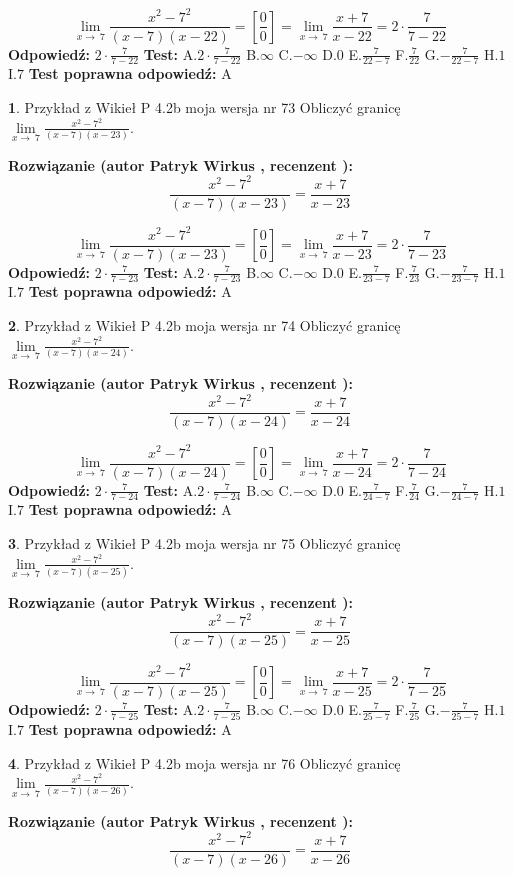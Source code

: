 \documentclass[12pt, a4paper]{article}
\theoremstyle{definition} %
\newtheorem{zad}{}
\newcommand{\zadStart}[1]{\begin{zad}#1\newline}
\newcommand{\zadStop}{\end{zad}}
\newcommand{\rozwStart}[2]{\noindent \textbf{Rozwiązanie (autor #1 , recenzent #2): }\newline}
\newcommand{\rozwStop}{\newline}
\newcommand{\odpStart}{\noindent \textbf{Odpowiedź:}\newline}
\newcommand{\odpStop}{\newline}
\newcommand{\testStart}{\noindent \textbf{Test:}\newline}
\newcommand{\testStop}{\newline}
\newcommand{\kluczStart}{\noindent \textbf{Test poprawna odpowiedź:}\newline}
\newcommand{\kluczStop}{\newline}
\begin{document}
$$\lim\limits_{x\to\ 7}\frac{x^{2}-7^{2}}{(x-7)(x-22)}=[\frac{0}{0}]=\lim\limits_{x\to\ 7}\frac{x+7}{x-22}=2 \cdot \frac{7}{7-22}$$
\rozwStop
\odpStart
$2 \cdot \frac{7}{7-22}$
\odpStop
\testStart
A.$2 \cdot \frac{7}{7-22}$
B.$\infty$
C.$-\infty$
D.$0$
E.$\frac{7}{22-7}$
F.$\frac{7}{22}$
G.$-\frac{7}{22-7}$
H.$1$
I.$7$
\testStop
\kluczStart
A
\kluczStop



\zadStart{Przykład z Wikieł P 4.2b moja wersja nr 73}
Obliczyć granicę $\lim\limits_{x\to\ 7}\frac{x^{2}-7^{2}}{(x-7)(x-23)}$.
\zadStop
\rozwStart{Patryk Wirkus}{}
$$\frac{x^{2}-7^{2}}{(x-7)(x-23)}=\frac{x+7}{x-23}$$

$$\lim\limits_{x\to\ 7}\frac{x^{2}-7^{2}}{(x-7)(x-23)}=[\frac{0}{0}]=\lim\limits_{x\to\ 7}\frac{x+7}{x-23}=2 \cdot \frac{7}{7-23}$$
\rozwStop
\odpStart
$2 \cdot \frac{7}{7-23}$
\odpStop
\testStart
A.$2 \cdot \frac{7}{7-23}$
B.$\infty$
C.$-\infty$
D.$0$
E.$\frac{7}{23-7}$
F.$\frac{7}{23}$
G.$-\frac{7}{23-7}$
H.$1$
I.$7$
\testStop
\kluczStart
A
\kluczStop



\zadStart{Przykład z Wikieł P 4.2b moja wersja nr 74}
Obliczyć granicę $\lim\limits_{x\to\ 7}\frac{x^{2}-7^{2}}{(x-7)(x-24)}$.
\zadStop
\rozwStart{Patryk Wirkus}{}
$$\frac{x^{2}-7^{2}}{(x-7)(x-24)}=\frac{x+7}{x-24}$$

$$\lim\limits_{x\to\ 7}\frac{x^{2}-7^{2}}{(x-7)(x-24)}=[\frac{0}{0}]=\lim\limits_{x\to\ 7}\frac{x+7}{x-24}=2 \cdot \frac{7}{7-24}$$
\rozwStop
\odpStart
$2 \cdot \frac{7}{7-24}$
\odpStop
\testStart
A.$2 \cdot \frac{7}{7-24}$
B.$\infty$
C.$-\infty$
D.$0$
E.$\frac{7}{24-7}$
F.$\frac{7}{24}$
G.$-\frac{7}{24-7}$
H.$1$
I.$7$
\testStop
\kluczStart
A
\kluczStop



\zadStart{Przykład z Wikieł P 4.2b moja wersja nr 75}
Obliczyć granicę $\lim\limits_{x\to\ 7}\frac{x^{2}-7^{2}}{(x-7)(x-25)}$.
\zadStop
\rozwStart{Patryk Wirkus}{}
$$\frac{x^{2}-7^{2}}{(x-7)(x-25)}=\frac{x+7}{x-25}$$

$$\lim\limits_{x\to\ 7}\frac{x^{2}-7^{2}}{(x-7)(x-25)}=[\frac{0}{0}]=\lim\limits_{x\to\ 7}\frac{x+7}{x-25}=2 \cdot \frac{7}{7-25}$$
\rozwStop
\odpStart
$2 \cdot \frac{7}{7-25}$
\odpStop
\testStart
A.$2 \cdot \frac{7}{7-25}$
B.$\infty$
C.$-\infty$
D.$0$
E.$\frac{7}{25-7}$
F.$\frac{7}{25}$
G.$-\frac{7}{25-7}$
H.$1$
I.$7$
\testStop
\kluczStart
A
\kluczStop



\zadStart{Przykład z Wikieł P 4.2b moja wersja nr 76}
Obliczyć granicę $\lim\limits_{x\to\ 7}\frac{x^{2}-7^{2}}{(x-7)(x-26)}$.
\zadStop
\rozwStart{Patryk Wirkus}{}
$$\frac{x^{2}-7^{2}}{(x-7)(x-26)}=\frac{x+7}{x-26}$$
\end{document}
